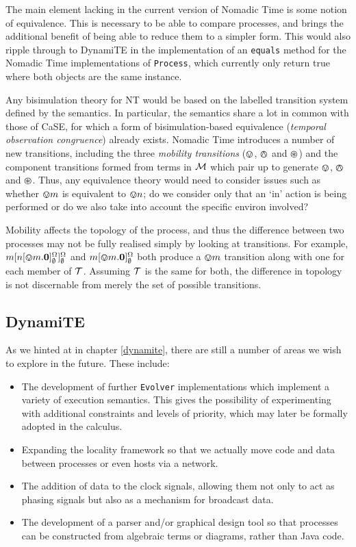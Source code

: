 The main element lacking in the current version of Nomadic Time is
some notion of equivalence.  This is necessary to be able to compare
processes, and brings the additional benefit of being able to reduce
them to a simpler form.  This would also ripple through to DynamiTE in
the implementation of an \texttt{equals} method for the Nomadic Time
implementations of \texttt{Process}, which currently only return true
where both objects are the same instance.

Any bisimulation theory for NT would be based on the labelled
transition system defined by the semantics.  In particular, the
semantics share a lot in common with those of CaSE, for which a form
of bisimulation-based equivalence (\emph{temporal observation
  congruence}) already exists.  Nomadic Time introduces a number of
new transitions, including the three \emph{mobility transitions}
($\varovee$, $\varowedge$ and $\varoast$) and the component transitions formed
from terms in $\text{$\mathcal{M}$}$ which pair up to generate $\varovee$, $\varowedge$ and
$\varoast$.  Thus, any equivalence theory would need to consider issues
such as whether $\varovee m$ is equivalent to $\varovee n$; do we
consider only that an `in' action is being performed or do we also take
into account the specific environ involved?

Mobility affects the topology of the process, and thus the difference
between two processes may not be fully realised simply by looking at
transitions.  For example, \linebreak
${m}[ {n}[ \varovee m.\textbf{0} ]^{\Omega}_{\emptyset} ]^{\Omega}_{\emptyset}$
and ${m}[ \varovee m.\textbf{0} ]^{\Omega}_{\emptyset}$ both produce a
$\varovee m$ transition along with one for each member of $\text{$\mathcal{T}$}$.
Assuming $\text{$\mathcal{T}$}$ is the same for both, the difference in topology is
not discernable from merely the set of possible transitions.

\subsection{DynamiTE}
\label{future:dynamite}

As we hinted at in chapter \ref{dynamite}, there are still a number of
areas we wish to explore in the future.  These include:

\begin{itemize}
\item The development of further \texttt{Evolver} implementations
  which implement a variety of execution semantics.  This gives the
  possibility of experimenting with additional constraints and levels
  of priority, which may later be formally adopted in the calculus.
\item Expanding the locality framework so that we actually move code
  and data between processes or even hosts via a network.
\item The addition of data to the clock signals, allowing them not
  only to act as phasing signals but also as a mechanism for broadcast
  data.
\item The development of a parser and/or graphical design tool so that
  processes can be constructed from algebraic terms or diagrams,
  rather than Java code.
\end{itemize}

